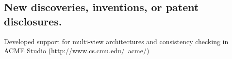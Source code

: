 \subsection{New discoveries, inventions, or patent disclosures.}

Developed support for multi-view architectures and consistency checking in ACME Studio (http://www.cs.cmu.edu/~acme/)

